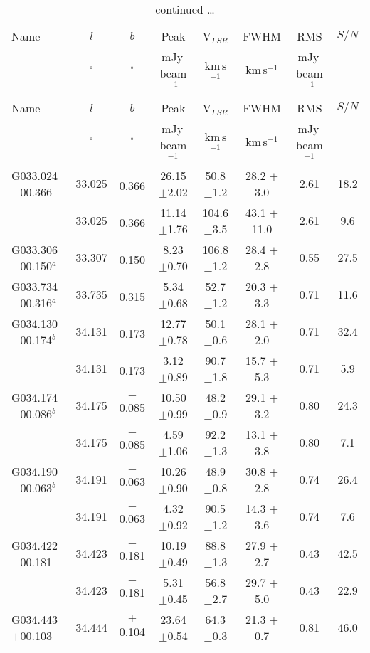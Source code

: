 \begin{ThreePartTable}
\begin{longtable}{lccccccc}
\caption{Catalog of 108 RRL detections towards 79 ``candidate'' HII regions from the WISE catalog\label{tab_HII_candidate}} \\
\hline
\hline
Name & $l$ & $b$ & Peak& V$_{LSR}$& FWHM& RMS& $S/N$\\
&$^\circ$&$^\circ$&mJy\,beam$^{-1}$&km\,s$^{-1}$&km\,s$^{-1}$&mJy\,beam$^{-1}$& \\
\hline
\endfirsthead
\caption{continued \ldots}\\
\hline
\hline
Name & $l$ & $b$ & Peak& V$_{LSR}$& FWHM& RMS& $S/N$\\
&$^\circ$&$^\circ$&mJy\,beam$^{-1}$&km\,s$^{-1}$&km\,s$^{-1}$&mJy\,beam$^{-1}$& \\
\hline
\endhead
\hline
\endfoot
\hline
\endlastfoot
G033.024$-$00.366     &33.025&$-$0.366&26.15	$\pm$2.02&50.8	$\pm$1.2	&28.2	$\pm$3.0	&2.61	&18.2\\
                      &33.025&$-$0.366&11.14	$\pm$1.76&104.6	$\pm$3.5	&43.1	$\pm$11.0	&2.61	&9.6\\
G033.306$-$00.150$^a$ &33.307&$-$0.150&8.23	$\pm$0.70&106.8	$\pm$1.2	&28.4	$\pm$2.8	&0.55	&27.5\\
G033.734$-$00.316$^a$ &33.735&$-$0.315&5.34	$\pm$0.68&52.7	$\pm$1.2	&20.3	$\pm$3.3	&0.71	&11.6\\
G034.130$-$00.174$^b$ &34.131&$-$0.173&12.77	$\pm$0.78&50.1	$\pm$0.6	&28.1	$\pm$2.0	&0.71	&32.4\\
                      &34.131&$-$0.173&3.12	$\pm$0.89&90.7	$\pm$1.8	&15.7	$\pm$5.3	&0.71	&5.9\\
G034.174$-$00.086$^b$ &34.175&$-$0.085&10.50	$\pm$0.99&48.2	$\pm$0.9	&29.1	$\pm$3.2	&0.80	&24.3\\
                      &34.175&$-$0.085&4.59	$\pm$1.06&92.2	$\pm$1.3	&13.1	$\pm$3.8	&0.80	&7.1\\
G034.190$-$00.063$^b$ &34.191&$-$0.063&10.26	$\pm$0.90&48.9	$\pm$0.8	&30.8	$\pm$2.8	&0.74	&26.4\\
                      &34.191&$-$0.063&4.32	$\pm$0.92&90.5	$\pm$1.2	&14.3	$\pm$3.6	&0.74	&7.6\\
G034.422$-$00.181     &34.423&$-$0.181&10.19	$\pm$0.49&88.8	$\pm$1.3	&27.9	$\pm$2.7	&0.43	&42.5\\
                      &34.423&$-$0.181&5.31	$\pm$0.45&56.8	$\pm$2.7	&29.7	$\pm$5.0	&0.43	&22.9\\
G034.443$+$00.103     &34.444&$+$0.104&23.64	$\pm$0.54&64.3	$\pm$0.3	&21.3	$\pm$0.7	&0.81	&46.0\\

\end{longtable}
\end{ThreePartTable}

